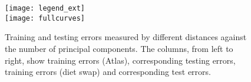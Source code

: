 \begin{figure}[!t]
\centering
\texttt{[image: legend\_ext]}\\%
\texttt{[image: fullcurves]}%
\caption{Training and testing errors measured by different distances
against the number of principal components.
The columns, from left to right, show training errors (Atlas),
corresponding testing errors, training errors (diet swap) and corresponding test errors.\label{fig:fullresult}}
\end{figure}




%
%

%
